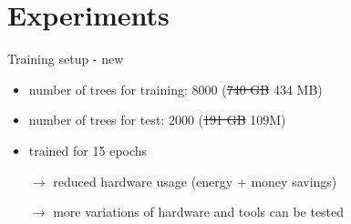 \documentclass[compress,aspectratio=169]{beamer}
\begin{document}
\section{Experiments}

\begin{frame}{Training setup - new}
\begin{itemize}
    \item number of trees for training: 8000 (\sout{740 GB} 434 MB)
    \item number of trees for test: 2000 (\sout{191 GB} 109M)
    \item trained for 15 epochs
    \item[$\rightarrow$] reduced hardware usage (energy + money savings)
    \item[$\rightarrow$] more variations of hardware and tools can be tested
\end{itemize}
\end{frame}
\end{document}
